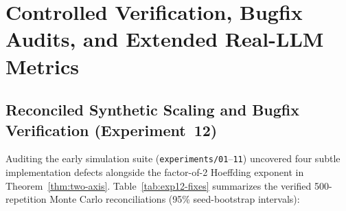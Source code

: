 \section{Controlled Verification, Bugfix Audits, and Extended Real-LLM Metrics}
\label{app:experiments}


\subsection{Reconciled Synthetic Scaling and Bugfix Verification (Experiment~12)}

Auditing the early simulation suite (\texttt{experiments/01}--\texttt{11}) uncovered
four subtle implementation defects alongside the factor-of-2 Hoeffding exponent
in Theorem~\ref{thm:two-axis}. Table~\ref{tab:exp12-fixes} summarizes the verified
500-repetition Monte Carlo reconciliations (95\% seed-bootstrap intervals):

\begin{table}[ht]
\centering
\caption{Summary of synthetic bugfixes verified in Experiment~12 (500~reps, $95\%$ seed-bootstrap CIs).}
\label{tab:exp12-fixes}
\end{table}

